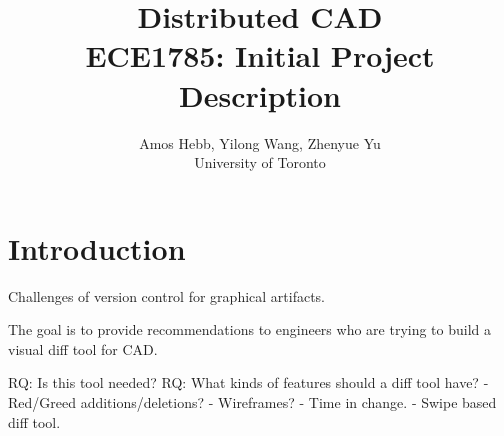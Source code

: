 \documentclass[journal,12pt,onecolumn,]{IEEEtran}
\begin{document}
\title{Distributed CAD\\
{\normalsize ECE1785: Initial Project Description}}

\author{Amos Hebb, Yilong Wang, Zhenyue Yu\\ \small University of Toronto}

\maketitle






\section{Introduction}

Challenges of version control for graphical artifacts.


The goal is to provide recommendations to engineers who are trying to build a visual diff tool for CAD.

RQ: Is this tool needed?
RQ: What kinds of features should a diff tool have?
- Red/Greed additions/deletions?
- Wireframes?
- Time in change.
- Swipe based diff tool.



\end{document}

